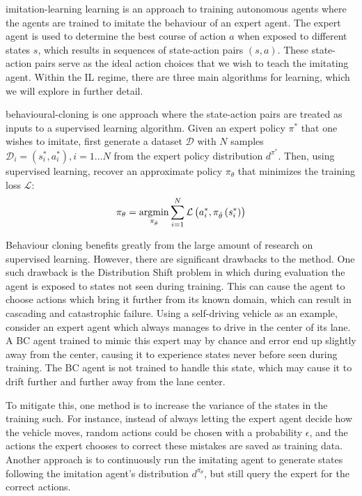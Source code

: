 \acrfull{imitation-learning} learning is an approach to training autonomous agents
where the agents are trained to imitate the behaviour of an expert agent.
The expert agent is used to determine the best course of action $a$ when exposed to different states $s$,
which results in sequences of state-action pairs $(s, a)$.
These state-action pairs serve as the ideal action choices
that we wish to teach the imitating agent.
Within the IL regime,
there are three main algorithms for learning,
which we will explore in further detail.

\acrfull{behavioural-cloning} is one approach where the state-action pairs
are treated as inputs to a supervised learning algorithm.
Given an expert policy $\pi^*$ that one wishes to imitate,
first generate a dataset $\mathcal{D}$
with $N$ samples $\mathcal{D}_i = (s^*_i, a^*_i), i = 1 \dots N$
from the expert policy distribution $d^{\pi^*}$.
Then, using supervised learning,
recover an approximate policy $\pi_\theta$
that minimizes the training loss $\mathcal{L}$:
$$
\pi_\theta =
    \operatorname*{argmin}_{\pi_{\hat{\theta}}}
        \sum_{i=1}^{N}
            \mathcal{L} \left(a_i^*, \pi_{\hat{\theta}} \left(s_i^*\right) \right)
$$

Behaviour cloning benefits greatly from the large amount of research on supervised learning. 
However, there are significant drawbacks to the method.
One such drawback is the 
Distribution Shift problem \cite{wensun:il}
in which during evaluation the agent is exposed to states
not seen during training.
This can cause the agent to choose actions which bring it further from its known domain,
which can result in cascading and catastrophic failure.
Using a self-driving vehicle as an example,
consider an expert agent which always manages to drive in the center of its lane.
A BC agent trained to mimic this expert may by chance and error end up slightly away from the center,
causing it to experience states never before seen during training.
The BC agent is not trained to handle this state,
which may cause it to drift further and further away from the lane center.

To mitigate this,
one method is to increase the variance of the states in the training such.
For instance,
instead of always letting the expert agent decide how the vehicle moves,
random actions could be chosen with a probability $\epsilon$,
and the actions the expert chooses to correct these mistakes are saved as training data.
Another approach is to continuously run the imitating agent to generate states
following the imitation agent's distribution $d^{\pi_{\theta}}$,
but still query the expert for the correct actions.

